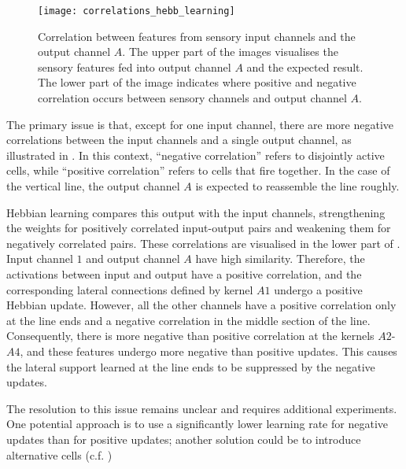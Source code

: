 \begin{figure}[h]
    \centering
    \texttt{[image: correlations\_hebb\_learning]}
    \caption[Feature correlation analysis]{Correlation between features from sensory input channels and the output channel $A$. The upper part of the images visualises the sensory features fed into output channel $A$ and the expected result. The lower part of the image indicates where positive and negative correlation occurs between sensory channels and output channel $A$.}
\end{figure}
%
The primary issue is that, except for one input channel, there are more negative correlations between the input channels and a single output channel, as illustrated in .
In this context, ``negative correlation'' refers to disjointly active cells, while ``positive correlation'' refers to cells that fire together.
In the case of the vertical line, the output channel $A$ is expected to reassemble the line roughly.

Hebbian learning compares this output with the input channels, strengthening the weights for positively correlated input-output pairs and weakening them for negatively correlated pairs.
These correlations are visualised in the lower part of .
Input channel $1$ and output channel $A$ have high similarity. Therefore, the activations between input and output have a positive correlation, and the corresponding lateral connections defined by kernel $A1$ undergo a positive Hebbian update.
However, all the other channels have a positive correlation only at the line ends and a negative correlation in the middle section of the line.
Consequently, there is more negative than positive correlation at the kernels $A2$-$A4$, and these features undergo more negative than positive updates.
This causes the lateral support learned at the line ends to be suppressed by the negative updates.

The resolution to this issue remains unclear and requires additional experiments. One potential approach is to use a significantly lower learning rate for negative updates than for positive updates; another solution could be to introduce alternative cells (c.f. )

